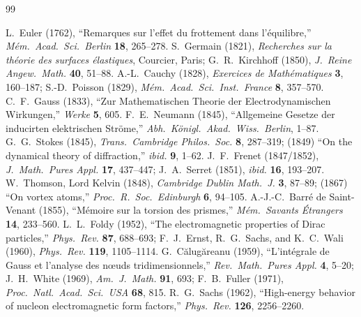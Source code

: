 \documentclass[11pt, a4paper]{article}
\begin{document}
\begin{thebibliography}{99}
\footnotesize
\setlength{\itemsep}{2pt}

 L.~Euler (1762), ``Remarques sur l'effet du frottement dans l'\'{e}quilibre,'' \textit{M\'{e}m.\ Acad.\ Sci.\ Berlin} \textbf{18}, 265--278.
 S.~Germain (1821), \textit{Recherches sur la th\'{e}orie des surfaces \'{e}lastiques}, Courcier, Paris; G.~R.~Kirchhoff (1850), \textit{J.\ Reine Angew.\ Math.} \textbf{40}, 51--88.
 A.-L.~Cauchy (1828), \textit{Exercices de Math\'{e}matiques} \textbf{3}, 160--187; S.-D.~Poisson (1829), \textit{M\'{e}m.\ Acad.\ Sci.\ Inst.\ France} \textbf{8}, 357--570.
 C.~F.~Gauss (1833), ``Zur Mathematischen Theorie der Electrodynamischen Wirkungen,'' \textit{Werke} \textbf{5}, 605.
 F.~E.~Neumann (1845), ``Allgemeine Gesetze der inducirten elektrischen Str\"{o}me,'' \textit{Abh.\ K\"{o}nigl.\ Akad.\ Wiss.\ Berlin}, 1--87.
 G.~G.~Stokes (1845), \textit{Trans.\ Cambridge Philos.\ Soc.} \textbf{8}, 287--319; (1849) ``On the dynamical theory of diffraction,'' \textit{ibid.} \textbf{9}, 1--62.
 J.~F.~Frenet (1847/1852), \textit{J.\ Math.\ Pures Appl.} \textbf{17}, 437--447; J.~A.~Serret (1851), \textit{ibid.} \textbf{16}, 193--207.
 W.~Thomson, Lord Kelvin (1848), \textit{Cambridge Dublin Math.\ J.} \textbf{3}, 87--89; (1867) ``On vortex atoms,'' \textit{Proc.\ R.\ Soc.\ Edinburgh} \textbf{6}, 94--105.
 A.-J.-C.~Barr\'{e} de Saint-Venant (1855), ``M\'{e}moire sur la torsion des prismes,'' \textit{M\'{e}m.\ Savants \'{E}trangers} \textbf{14}, 233--560.
 L.~L.~Foldy (1952), ``The electromagnetic properties of Dirac particles,'' \textit{Phys.\ Rev.} \textbf{87}, 688--693; F.~J.~Ernst, R.~G.~Sachs, and K.~C.~Wali (1960), \textit{Phys.\ Rev.} \textbf{119}, 1105--1114.
 G.~C\u{a}lug\u{a}reanu (1959), ``L'int\'{e}grale de Gauss et l'analyse des n\oe uds tridimensionnels,'' \textit{Rev.\ Math.\ Pures Appl.} \textbf{4}, 5--20; J.~H.~White (1969), \textit{Am.\ J.\ Math.} \textbf{91}, 693; F.~B.~Fuller (1971), \textit{Proc.\ Natl.\ Acad.\ Sci.\ USA} \textbf{68}, 815.
 R.~G.~Sachs (1962), ``High-energy behavior of nucleon electromagnetic form factors,'' \textit{Phys.\ Rev.} \textbf{126}, 2256--2260.

\end{thebibliography}
\end{document}
